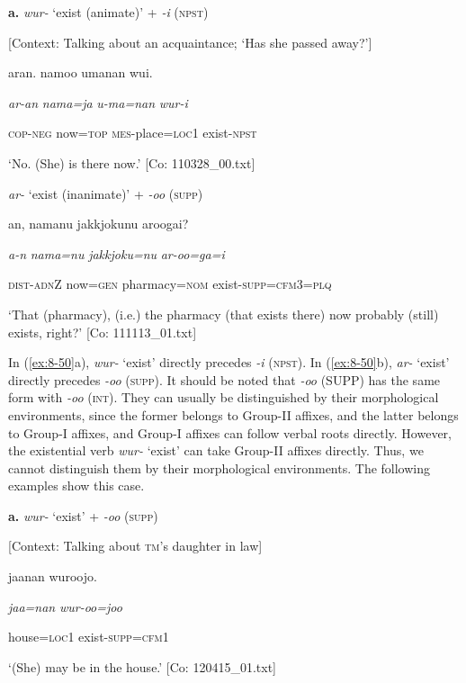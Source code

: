   \textbf{a.}  \textit{wur-} ‘exist (animate)’ + \textit{-i} (\textsc{npst})

    [Context: Talking about an acquaintance;{\US}
\glll  ‘Has she passed away?’]

    {\TM}
\glll  aran.  namoo  umanan  wui.

      \textit{ar-an}  \textit{nama=ja}  \textit{u-ma=nan}  \textit{wur-i}

      \textsc{cop}-\textsc{neg}  now=\textsc{top}  \textsc{mes}-place=\textsc{loc}1  exist-\textsc{npst}

\glt ‘No. (She) is there now.’ [Co: 110328\_00.txt]
\z

\ex  \textit{ar-} ‘exist (inanimate)’ + \textit{-oo} (\textsc{supp})

    {\TM}
\glll  an,  namanu  {\textbar}jakkjoku{\textbar}nu  aroogai?

      \textit{a-n}  \textit{nama=nu}  \textit{jakkjoku=nu}  \textit{ar-oo=ga=i}

      \textsc{dist}-\textsc{adn}Z  now=\textsc{gen}  pharmacy=\textsc{nom}  exist-\textsc{supp}=\textsc{cfm}3=\textsc{plq}

\glt ‘That (pharmacy), (i.e.) the pharmacy (that exists there) now probably (still) exists, right?’ [Co: 111113\_01.txt]
\z

In (\ref{ex:8-50}a), \textit{wur-} ‘exist’ directly precedes \textit{{}-i} (\textsc{npst}). In (\ref{ex:8-50}b), \textit{ar-} ‘exist’ directly precedes \textit{{}-oo} (\textsc{supp}). It should be noted that \textit{{}-oo} (SUPP) has the same form with \textit{{}-oo} (\textsc{int}). They can usually be distinguished by their morphological environments, since the former belongs to Group-II affixes, and the latter belongs to Group-I affixes, and Group-I affixes can follow verbal roots directly. However, the existential verb \textit{wur-} ‘exist’ can take Group-II affixes directly. Thus, we cannot distinguish them by their morphological environments. The following examples show this case.

\textbf{\ea\label{ex:8-51}
}  \textbf{a.}  \textit{wur-} ‘exist’ + \textit{{}-oo} (\textsc{supp})

    [Context: Talking about \textsc{tm}’s daughter in law]

    {\TM}
\glll  jaanan  wuroojo.

      \textit{jaa=nan}  \textit{wur-oo=joo}

      house=\textsc{loc}1  exist-\textsc{supp}=\textsc{cfm1}

\glt ‘(She) may be in the house.’ [Co: 120415\_01.txt]
\z

